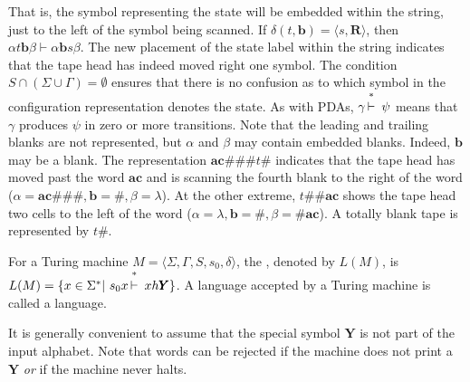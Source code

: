 That is, the symbol representing the state will be embedded within the string,
just to the left of the symbol being scanned. If $\delta(t,\pmb{b})=\langle s,
\pmb{R}\rangle$, then $\alpha t\pmb{b}\beta\vdash\alpha\pmb{b} s\beta$. The
new placement of the state label within the string indicates that the tape
head has indeed moved right one symbol. The condition $S\cap(\Sigma\cup\Gamma)=
\emptyset$ ensures that there is no confusion as to which symbol in the
configuration representation denotes the state. As with PDAs, $\gamma\Dvdash\psi$
means that $\gamma$ produces $\psi$ in zero or more transitions. Note that the
leading and trailing blanks are not represented, but $\alpha$ and $\beta$ may
contain embedded blanks. Indeed, $\pmb{b}$ may be a blank. The representation $\pmb{ac\#
\#\#}t\pmb{\#}$ indicates that the tape head has moved past the word $\pmb{ac}$ and is
scanning the fourth blank to the right of the word ($\alpha=\pmb{ac\#\#\#},
\pmb{b}=\pmb{\#},\beta=\lambda$). At the other extreme, $t\pmb{\#\#ac}$ shows
the tape head two cells to the left of the word ($\alpha=\lambda,\pmb{b}=
\pmb{\#},\beta=\pmb{\#ac}$). A totally blank tape is represented by $t\pmb{\#}$.

\begin{dfn}\label{dfn-11.3}
For a Turing machine $M=\langle\Sigma,\Gamma,S,s_0,\delta\rangle$, the
\emph{}, denoted by $L(M)$, is $L(M)=\{x\in
\Sigma^*|\ s_0 x\Dvdash xh\pmb{Y}\}$. A language accepted by a Turing machine is
called a \emph{} language.
\end{dfn}

It is generally convenient to assume that the special symbol $\pmb{Y}$ is not
part of the input alphabet. Note that words can be rejected if the machine does
not print a $\pmb{Y}$ \emph{or} if the machine never halts.

